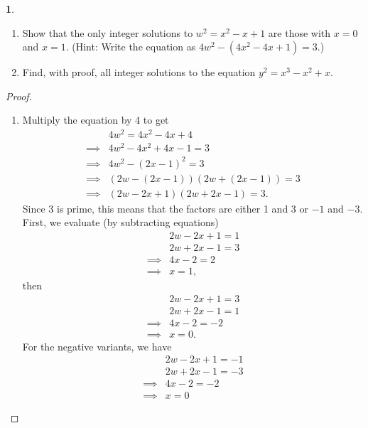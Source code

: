 \documentclass[12pt]{article}
\theoremstyle{definition}
\newtheorem{ex}{}
\begin{document}
\begin{ex}\
	\begin{enumerate}[label=(\alph*)]
		\item Show that the only integer solutions to $w^2 = x^2 - x + 1$ are those with $x = 0$ and $x = 1$. (Hint: Write the equation as $4w^2 - (4x^2 - 4x + 1) = 3$.)
		\item Find, with proof, all integer solutions to the equation $y^2 = x^3 - x^2 + x$.
	\end{enumerate}
\end{ex}
\begin{proof}
	\begin{enumerate}[label=(\alph*)]
		\item Multiply the equation by 4 to get \begin{align*}
			               & 4w^2 = 4x^2 - 4x + 4       \\
			      \implies & 4w^2 - 4x^2 + 4x - 1 = 3   \\
			      \implies & 4w^2 - (2x-1)^2 = 3        \\
			      \implies & (2w-(2x-1))(2w+(2x-1)) = 3 \\
			      \implies & (2w-2x+1)(2w+2x-1) = 3.
		      \end{align*}
		      Since 3 is prime, this means that the factors are either 1 and 3 or $-1$ and $-3$.
		      First, we evaluate (by subtracting equations) \begin{align*}
			               & 2w - 2x + 1 = 1 \\
			               & 2w + 2x - 1 = 3 \\
			      \implies & 4x - 2 = 2      \\
			      \implies & x = 1,
		      \end{align*}
		      then \begin{align*}
			               & 2w - 2x + 1 = 3 \\
			               & 2w + 2x - 1 = 1 \\
			      \implies & 4x - 2 = -2     \\
			      \implies & x = 0.
		      \end{align*}
		      For the negative variants, we have \begin{align*}
			               & 2w - 2x + 1 = -1 \\
			               & 2w + 2x - 1 = -3 \\
			      \implies & 4x - 2 = -2      \\
			      \implies & x = 0
		      \end{align*}

\end{enumerate}
\end{proof}
\end{document}
